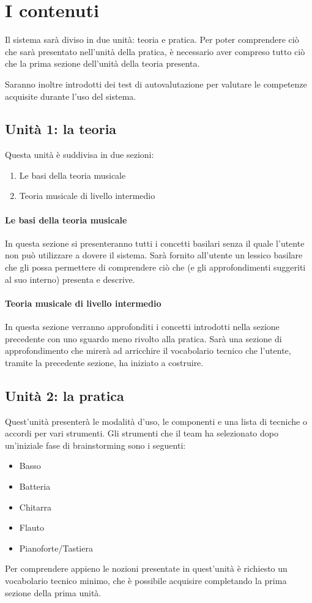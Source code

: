 \section{I contenuti}
Il sistema sarà diviso in due unità: teoria e pratica. Per poter comprendere ciò che sarà presentato nell'unità della pratica, è necessario aver compreso tutto ciò che la prima sezione dell'unità della teoria presenta.

Saranno inoltre introdotti dei test di autovalutazione per valutare le competenze acquisite durante l'uso del sistema.

\subsection{Unità 1: la teoria}
Questa unità è suddivisa in due sezioni:
\begin{enumerate}
	\item Le basi della teoria musicale
	\item Teoria musicale di livello intermedio
\end{enumerate}

\paragraph{Le basi della teoria musicale} In questa sezione si presenteranno tutti i concetti basilari senza il quale l'utente non può utilizzare a dovere il sistema. Sarà fornito all'utente un lessico basilare che gli possa permettere di comprendere ciò che \ProjectTitle{} (e gli approfondimenti suggeriti al suo interno) presenta e descrive.
\paragraph{Teoria musicale di livello intermedio} In questa sezione verranno approfonditi i concetti introdotti nella sezione precedente con uno sguardo meno rivolto alla pratica. Sarà una sezione di approfondimento che mirerà ad arricchire il vocabolario tecnico che l'utente, tramite la precedente sezione, ha iniziato a costruire.

\subsection{Unità 2: la pratica}
Quest'unità presenterà le modalità d'uso, le componenti e una lista di tecniche o accordi per vari strumenti. Gli strumenti che il team ha selezionato dopo un'iniziale fase di brainstorming sono i seguenti:
\begin{itemize}
	\item Basso
	\item Batteria
	\item Chitarra
	\item Flauto
	\item Pianoforte/Tastiera
\end{itemize}
Per comprendere appieno le nozioni presentate in quest'unità è richiesto un vocabolario tecnico minimo, che è possibile acquisire completando la prima sezione della prima unità.

